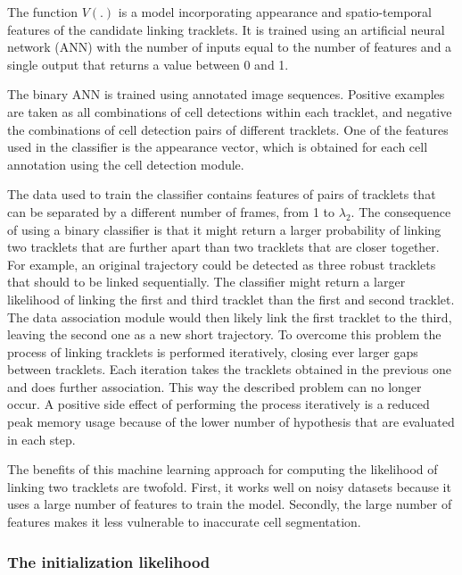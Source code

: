      	   	The function $V(.)$ is a model incorporating appearance and spatio-temporal features of the candidate linking tracklets. It is trained using an artificial neural network (ANN) with the number of inputs equal to the number of features and a single output that returns a value between 0 and 1. 
     	   	
     	   	The binary ANN is trained using annotated image sequences. Positive examples are taken as all combinations of cell detections within each tracklet, and negative the combinations of cell detection pairs of different tracklets. One of the features used in the classifier is the appearance vector, which is obtained for each cell annotation using the cell detection module.
     	   	
     	   	The data used to train the classifier contains features of pairs of tracklets that can be separated by a different number of frames, from 1 to $\lambda_2$. The consequence of using a binary classifier is that it might return a larger probability of linking two tracklets that are further apart than two tracklets that are closer together. For example, an original trajectory could be detected as three robust tracklets that should to be linked sequentially. The classifier might return a larger likelihood of linking the first and third tracklet than the first and second tracklet. The data association module would then likely link the first tracklet to the third, leaving the second one as a new short trajectory. To overcome this problem the process of linking tracklets is performed iteratively, closing ever larger gaps between tracklets. Each iteration takes the tracklets obtained in the previous one and does further association. This way the described problem can no longer occur. A positive side effect of performing the process iteratively is a reduced peak memory usage because of the lower number of hypothesis that are evaluated in each step.

     	   	The benefits of this machine learning approach for computing the likelihood of linking two tracklets are twofold. First, it works well on noisy datasets because it uses a large number of features to train the model. Secondly, the large number of features makes it less vulnerable to inaccurate cell segmentation.
     	   	
       	\subsubsection{The initialization likelihood \statusfirstdraft}
       		
